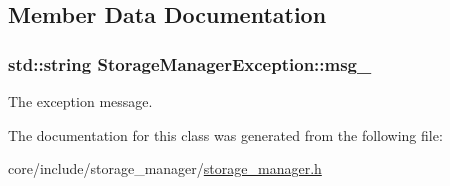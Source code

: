 \subsection{Member Data Documentation}
\hypertarget{classStorageManagerException_a27cd47592b9bd7cf5fb83dcb6ba78b28}{}
\subsubsection[{msg\+\_\+}]{\setlength{\rightskip}{0pt plus 5cm}std\+::string Storage\+Manager\+Exception\+::msg\+\_\+\hspace{0.3cm}{\ttfamily [private]}}\label{classStorageManagerException_a27cd47592b9bd7cf5fb83dcb6ba78b28}
The exception message. 

The documentation for this class was generated from the following file\+:\begin{DoxyCompactItemize}
\item 
core/include/storage\+\_\+manager/\hyperlink{storage__manager_8h}{storage\+\_\+manager.\+h}\end{DoxyCompactItemize}

